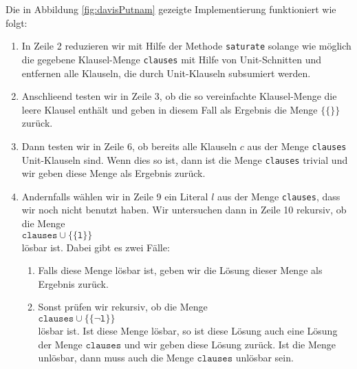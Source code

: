 Die in Abbildung \ref{fig:davisPutnam} gezeigte Implementierung funktioniert wie folgt:
\begin{enumerate}
\item In Zeile 2 reduzieren wir mit Hilfe der Methode \texttt{saturate} 
      solange wie m\"{o}glich die gegebene Klausel-Menge \texttt{clauses} mit Hilfe
      von Unit-Schnitten und entfernen alle Klauseln, die durch Unit-Klauseln
      subsumiert werden.
\item Anschlie\3end testen wir in Zeile 3, ob die so vereinfachte Klausel-Menge
      die leere Klausel enth\"{a}lt und geben in diesem Fall als Ergebnis die Menge 
      $\bigl\{\{\}\bigr\}$ zur\"{u}ck.
\item Dann testen wir in Zeile 6, ob bereits alle Klauseln $c$ aus der Menge
      \texttt{clauses} Unit-Klauseln sind.  Wenn dies so ist,
      dann ist die Menge \texttt{clauses} trivial und wir geben diese Menge als Ergebnis zur\"{u}ck.
\item Andernfalls w\"{a}hlen wir in Zeile 9 ein Literal $l$ aus der Menge \texttt{clauses}, 
      dass wir noch nicht benutzt haben.
      Wir untersuchen dann in Zeile 10 rekursiv, ob die Menge \\[0.2cm]
      \hspace*{1.3cm} 
      $\mathtt{clauses} \cup \bigl\{\{\mathtt{l}\}\bigr\}$ 
      \\[0.2cm]
      l\"{o}sbar ist.  Dabei gibt es zwei F\"{a}lle:
      \begin{enumerate}
      \item Falls diese Menge l\"{o}sbar ist, geben wir die L\"{o}sung dieser Menge als Ergebnis zur\"{u}ck.

      \item Sonst  pr\"{u}fen wir rekursiv, ob die Menge 
            \\[0.2cm]
            \hspace*{1.3cm}
            $\mathtt{clauses} \cup \bigl\{ \{ \neg \mathtt{l}\} \bigr\}$ 
            \\[0.2cm]
            l\"{o}sbar ist.  Ist diese Menge l\"{o}sbar, so ist diese L\"{o}sung auch eine
            L\"{o}sung der Menge $\mathtt{clauses}$ und wir geben diese L\"{o}sung zur\"{u}ck.  Ist die
            Menge unl\"{o}sbar, dann muss auch die Menge $\mathtt{clauses}$ unl\"{o}sbar sein.
      \end{enumerate}
\end{enumerate}
